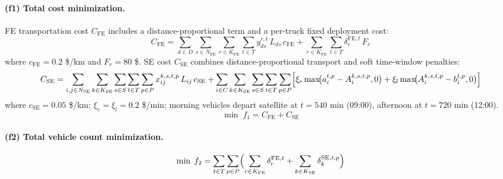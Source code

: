 \documentclass[11pt, a4paper]{article}
\newcommand{\KFE}{K_{\mathrm{FE}}}
\newcommand{\KSE}{K_{\mathrm{SE}}}
\newcommand{\NFE}{N_{\mathrm{FE}}}
\newcommand{\NSE}{N_{\mathrm{SE}}}
\newcommand{\cFE}{c_{\mathrm{FE}}}
\newcommand{\cSE}{c_{\mathrm{SE}}}
\newcommand{\CFE}{C_{\mathrm{FE}}}
\newcommand{\CSE}{C_{\mathrm{SE}}}
\numberwithin{equation}{section}
\begin{document}
\paragraph{(f1) Total cost minimization.}
FE transportation cost $\CFE$ includes a distance-proportional term and a
per-truck fixed deployment cost:
\begin{equation}
  \CFE = \sum_{d\in D}\sum_{s\in\NFE}\sum_{r\in\KFE}\sum_{t\in T}
           y_{ds}^{r,t}\,L_{ds}\,\cFE
         + \sum_{r\in\KFE}\sum_{t\in T}\delta_r^{\mathrm{FE},t}\,F_r
  \label{eq:CFE}
\end{equation}
where $\cFE = 0.2$ \$/km and $F_r = 80$ \$.  SE cost $\CSE$ combines
distance-proportional transport and soft time-window penalties:
\begin{equation}
  \CSE = \sum_{i,j\in\NSE}\sum_{k\in\KSE}\sum_{s\in S}\sum_{t\in T}\sum_{p\in P}
           x_{ij}^{k,s,t,p}\,L_{ij}\,\cSE
         + \sum_{i\in C}\sum_{k\in\KSE}\sum_{s\in S}\sum_{t\in T}\sum_{p\in P}
           \Bigl[\xi_e\max\!\bigl(a_i^{t,p}-A_i^{k,s,t,p},0\bigr)
                +\xi_l\max\!\bigl(A_i^{k,s,t,p}-b_i^{t,p},0\bigr)\Bigr]
  \label{eq:CSE}
\end{equation}
where $\cSE=0.05$ \$/km; $\xi_e=\xi_l=0.2$ \$/min; morning vehicles depart
satellite at $t=540$ min (09:00), afternoon at $t=720$ min (12:00).
\begin{equation}
  \min\;f_1 = \CFE + \CSE
  \label{eq:f1}
\end{equation}

\paragraph{(f2) Total vehicle count minimization.}
\begin{equation}
  \min\;f_2 = \sum_{t\in T}\sum_{p\in P}
    \Bigl(\sum_{r\in\KFE}\delta_r^{\mathrm{FE},t}
         +\sum_{k\in\KSE}\delta_k^{\mathrm{SE},t,p}\Bigr)
  \label{eq:f2}
\end{equation}
\end{document}
